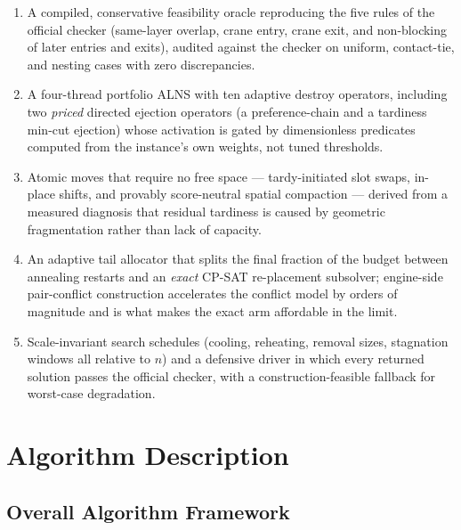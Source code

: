 \documentclass[runningheads]{llncs}
\begin{document}
\begin{enumerate}
\item A compiled, conservative feasibility oracle reproducing the five rules
of the official checker (same-layer overlap, crane entry, crane exit, and
non-blocking of later entries and exits), audited against the checker on
uniform, contact-tie, and nesting cases with zero discrepancies.
\item A four-thread portfolio ALNS with ten adaptive destroy operators,
including two \emph{priced} directed ejection operators (a preference-chain
and a tardiness min-cut ejection) whose activation is gated by dimensionless
predicates computed from the instance's own weights, not tuned thresholds.
\item Atomic moves that require no free space --- tardy-initiated slot swaps,
in-place shifts, and provably score-neutral spatial compaction --- derived
from a measured diagnosis that residual tardiness is caused by geometric
fragmentation rather than lack of capacity.
\item An adaptive tail allocator that splits the final fraction of the budget
between annealing restarts and an \emph{exact} CP-SAT re-placement subsolver;
engine-side pair-conflict construction accelerates the conflict model by
orders of magnitude and is what makes the exact arm affordable in the limit.
\item Scale-invariant search schedules (cooling, reheating, removal sizes,
stagnation windows all relative to $n$) and a defensive driver in which every
returned solution passes the official checker, with a construction-feasible
fallback for worst-case degradation.
\end{enumerate}

\section{Algorithm Description}

\subsection{Overall Algorithm Framework}
\end{document}
